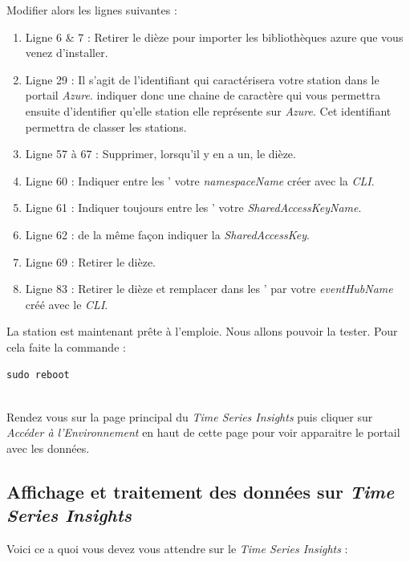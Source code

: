 Modifier alors les lignes suivantes : 
\begin{enumerate} %
	\item Ligne 6 & 7 : Retirer le dièze pour importer les bibliothèques azure que vous venez d'installer.
	\item Ligne 29 : Il s'agit de l'identifiant qui caractérisera votre station dans le portail \textit{Azure}. indiquer donc une chaine de caractère qui vous permettra ensuite d'identifier qu'elle station elle représente sur \textit{Azure}. Cet identifiant permettra de classer les stations.
	\item Ligne 57 à 67 : Supprimer, lorsqu'il y en a un, le dièze.
	\item Ligne 60 : Indiquer entre les ' votre \textit{namespaceName} créer avec la \textit{CLI}.
	\item Ligne 61 : Indiquer toujours entre les ' votre \textit{SharedAccessKeyName}.
	\item Ligne 62 : de la même façon indiquer la \textit{SharedAccessKey}.
	\item Ligne 69 : Retirer le dièze.
	\item Ligne 83 : Retirer le dièze et remplacer dans les ' par votre \textit{eventHubName} créé avec le \textit{CLI}. 
\end{enumerate}

La station est maintenant prête à l'emploie. Nous allons pouvoir la tester. Pour cela faite la commande :\\

\begin{lstlisting}[style=MyBashStyle]
	sudo reboot
\end{lstlisting}\\

Rendez vous sur la page principal du \textit{Time Series Insights} puis cliquer sur \textit{Accéder à l'Environnement} en haut de cette page pour voir apparaitre le portail avec les données.

\subsection{Affichage et traitement des données sur \textit{Time Series Insights}}

Voici ce a quoi vous devez vous attendre sur le \textit{Time Series Insights} : \\

